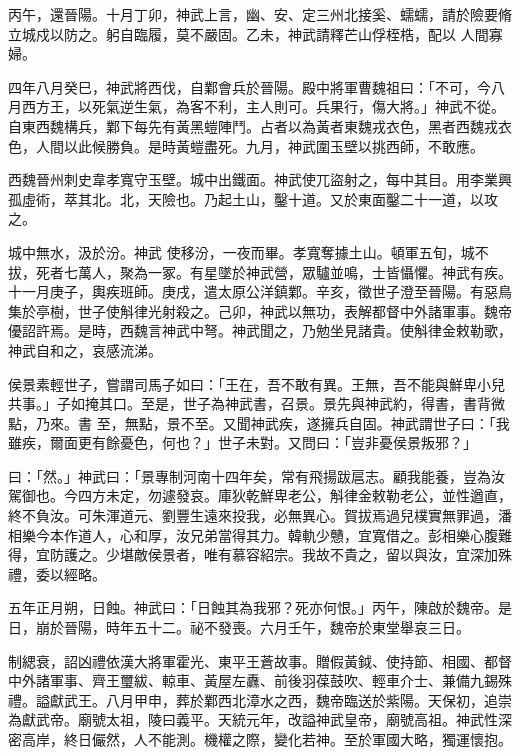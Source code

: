 \begin{pinyinscope}
 丙午，還晉陽。十月丁卯，神武上言，幽、安、定三州北接奚、蠕蠕，請於險要脩立城戍以防之。躬自臨履，莫不嚴固。乙未，神武請釋芒山俘桎梏，配以
 人間寡婦。



 四年八月癸巳，神武將西伐，自鄴會兵於晉陽。殿中將軍曹魏祖曰：「不可，今八月西方王，以死氣逆生氣，為客不利，主人則可。兵果行，傷大將。」神武不從。自東西魏構兵，鄴下每先有黃黑螘陣鬥。占者以為黃者東魏戎衣色，黑者西魏戎衣色，人間以此候勝負。是時黃螘盡死。九月，神武圍玉壁以挑西師，不敢應。



 西魏晉州刺史韋孝寬守玉壁。城中出鐵面。神武使兀盜射之，每中其目。用李業興孤虛術，萃其北。北，天險也。乃起土山，鑿十道。又於東面鑿二十一道，以攻之。



 城中無水，汲於汾。神武
 使移汾，一夜而畢。孝寬奪據土山。頓軍五旬，城不拔，死者七萬人，聚為一冢。有星墜於神武營，眾驢並鳴，士皆懾懼。神武有疾。十一月庚子，輿疾班師。庚戌，遣太原公洋鎮鄴。辛亥，徵世子澄至晉陽。有惡鳥集於亭樹，世子使斛律光射殺之。己卯，神武以無功，表解都督中外諸軍事。魏帝優詔許焉。是時，西魏言神武中弩。神武聞之，乃勉坐見諸貴。使斛律金敕勒歌，神武自和之，哀感流涕。



 侯景素輕世子，嘗謂司馬子如曰：「王在，吾不敢有異。王無，吾不能與鮮卑小兒共事。」子如掩其口。至是，世子為神武書，召景。景先與神武約，得書，書背微點，乃來。書
 至，無點，景不至。又聞神武疾，遂擁兵自固。神武謂世子曰：「我雖疾，爾面更有餘憂色，何也？」世子未對。又問曰：「豈非憂侯景叛邪？」



 曰：「然。」神武曰：「景專制河南十四年矣，常有飛揚跋扈志。顧我能養，豈為汝駕御也。今四方未定，勿遽發哀。庫狄乾鮮卑老公，斛律金敕勒老公，並性遒直，終不負汝。可朱渾道元、劉豐生遠來投我，必無異心。賀拔焉過兒樸實無罪過，潘相樂今本作道人，心和厚，汝兄弟當得其力。韓軌少戇，宜寬借之。彭相樂心腹難得，宜防護之。少堪敵侯景者，唯有慕容紹宗。我故不貴之，留以與汝，宜深加殊禮，委以經略。



 五年正月朔，日蝕。神武曰：「日蝕其為我邪？死亦何恨。」丙午，陳啟於魏帝。是日，崩於晉陽，時年五十二。祕不發喪。六月壬午，魏帝於東堂舉哀三日。



 制緦衰，詔凶禮依漢大將軍霍光、東平王蒼故事。贈假黃鉞、使持節、相國、都督中外諸軍事、齊王璽紱、輬車、黃屋左纛、前後羽葆鼓吹、輕車介士、兼備九錫殊禮。謚獻武王。八月甲申，葬於鄴西北漳水之西，魏帝臨送於紫陽。天保初，追崇為獻武帝。廟號太祖，陵曰義平。天統元年，改謚神武皇帝，廟號高祖。神武性深密高岸，終日儼然，人不能測。機權之際，變化若神。至於軍國大略，獨運懷抱。




\end{pinyinscope}
